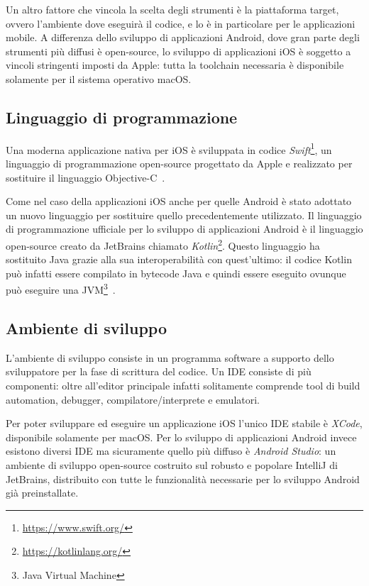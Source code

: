 Un altro fattore che vincola la scelta degli strumenti è la piattaforma target, ovvero l'ambiente dove eseguirà il codice, e lo è in particolare per le applicazioni mobile. A differenza dello sviluppo di applicazioni Android, dove gran parte degli strumenti più diffusi è open-source, lo sviluppo di applicazioni iOS è soggetto a vincoli stringenti imposti da Apple: tutta la toolchain necessaria è disponibile solamente per il sistema operativo macOS.

\subsection*{Linguaggio di programmazione}
Una moderna applicazione nativa per iOS è sviluppata in codice \textit{Swift}\footnote{\href{https://www.swift.org/}{https://www.swift.org/}}, un linguaggio di programmazione open-source progettato da Apple e realizzato per sostituire il linguaggio Objective-C~\cite{kerr2018beginning}.

Come nel caso della applicazioni iOS anche per quelle Android è stato adottato un nuovo linguaggio per sostituire quello precedentemente utilizzato. Il linguaggio di programmazione ufficiale per lo sviluppo di applicazioni Android è il linguaggio open-source creato da JetBrains chiamato \textit{Kotlin}\footnote{\href{https://kotlinlang.org/}{https://kotlinlang.org/}}. Questo linguaggio ha sostituito Java grazie alla sua interoperabilità con quest'ultimo: il codice Kotlin può infatti essere compilato in bytecode Java e quindi essere eseguito ovunque può eseguire una JVM\footnote{Java Virtual Machine}~\cite{laurence2021programming}.

\subsection*{Ambiente di sviluppo}
L'ambiente di sviluppo consiste in un programma software a supporto dello sviluppatore per la fase di scrittura del codice. Un IDE consiste di più componenti: oltre all'editor principale infatti solitamente comprende tool di build automation, debugger, compilatore/interprete e emulatori.

Per poter sviluppare ed eseguire un applicazione iOS l'unico IDE stabile è \textit{XCode}, disponibile solamente per macOS. Per lo sviluppo di applicazioni Android invece esistono diversi IDE ma sicuramente quello più diffuso è \textit{Android Studio}: un ambiente di sviluppo open-source costruito sul robusto e popolare IntelliJ di JetBrains, distribuito con tutte le funzionalità necessarie per lo sviluppo Android già preinstallate.


